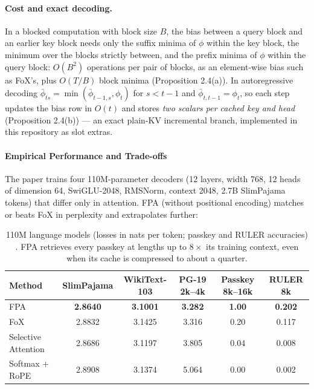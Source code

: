 \paragraph{Cost and exact decoding.} In a blocked computation with block size $B$, the bias between a query block and an earlier key block needs only the suffix minima of $\phi$ within the key block, the minimum over the blocks strictly between, and the prefix minima of $\phi$ within the query block: $O(B^2)$ operations per pair of blocks, as an element-wise bias such as FoX's, plus $O(T/B)$ block minima (Proposition 2.4(a)). In autoregressive decoding $\bar{\phi}_{ts}=\min(\bar{\phi}_{t-1,s},\phi_t)$ for $s<t-1$ and $\bar{\phi}_{t,t-1}=\phi_t$, so each step updates the bias row in $O(t)$ and stores \emph{two scalars per cached key and head} (Proposition 2.4(b)) --- an exact plain-KV incremental branch, implemented in this repository as slot extras.

\paragraph{Empirical Performance and Trade-offs}

The paper trains four 110M-parameter decoders (12 layers, width 768, 12 heads of dimension 64, SwiGLU-2048, RMSNorm, context 2048, 2.7B SlimPajama tokens) that differ only in attention. FPA (without positional encoding) matches or beats FoX in perplexity and extrapolates further:

\begin{table}[H]
\centering
\footnotesize
\begin{tabular}{lccccc}
\toprule
\textbf{Method} & \textbf{SlimPajama} & \textbf{WikiText-103} & \textbf{PG-19 2k--4k} & \textbf{Passkey 8k--16k} & \textbf{RULER 8k} \\
\midrule
FPA & \textbf{2.8640} & \textbf{3.1001} & \textbf{3.282} & \textbf{1.00} & \textbf{0.202} \\
FoX & 2.8832 & 3.1425 & 3.316 & 0.20 & 0.117 \\
Selective Attention & 2.8686 & 3.1197 & 3.805 & 0.04 & 0.008 \\
Softmax + RoPE & 2.8908 & 3.1374 & 5.064 & 0.00 & 0.002 \\
\bottomrule
\end{tabular}
\caption{110M language models (losses in nats per token; passkey and RULER accuracies) \citep{liu_first_passage_2026}. FPA retrieves every passkey at lengths up to $8\times$ its training context, even when its cache is compressed to about a quarter.}
\label{tab:fpa-lm}
\end{table}

